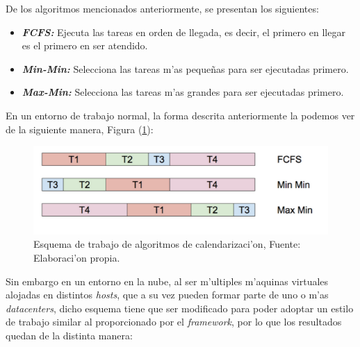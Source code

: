 De los algoritmos mencionados anteriormente, se presentan los siguientes:


\begin{itemize}
	\item \textit{\textbf{FCFS:}} Ejecuta las tareas en orden de llegada, es decir, el primero en llegar es el primero en ser atendido.
	\item \textit{\textbf{Min-Min:}} Selecciona las tareas m'as pequeñas para ser ejecutadas primero.
	\item  \textit{\textbf{Max-Min:}} Selecciona las tareas m'as grandes para ser ejecutadas primero.
\end{itemize}

En un entorno de trabajo normal, la forma descrita anteriormente la podemos ver de la siguiente manera, Figura (\ref{fig:cuatro}):


\renewcommand\thefigure{\arabic{figure}}
\begin{figure}[H]
	\centering
	\includegraphics[scale=0.7]{media/imagendos}
	\caption{Esquema de trabajo de algoritmos de calendarizaci'on, Fuente: Elaboraci'on propia.}
	\label{fig:cuatro}
\end{figure}


Sin embargo en un entorno en la nube, al ser m'ultiples m'aquinas virtuales alojadas en distintos \textit{hosts}, que a su vez pueden formar parte de uno o m'as \textit{datacenters}, dicho esquema tiene que ser modificado para poder adoptar un estilo de trabajo similar al proporcionado por el \textit{framework}, por lo que los resultados quedan de la distinta manera:

\newpage

